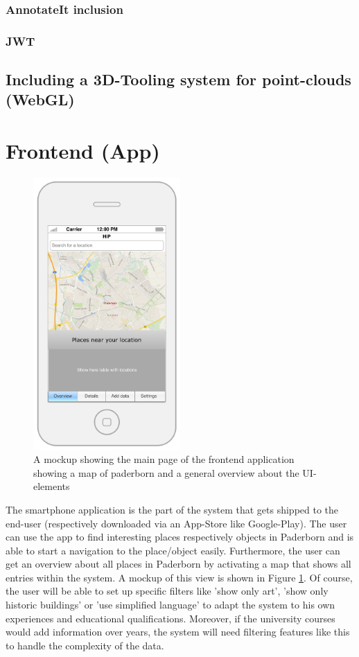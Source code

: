 \subsubsection{AnnotateIt inclusion}

\subsubsection{JWT}

\subsection{Including a 3D-Tooling system for point-clouds (WebGL)}

\section{Frontend (App)}
\begin{figure}[th]
\centerline{\includegraphics[width=0.5\textwidth]{gfx/mockup_app_1}}
\caption{A mockup showing the main page of the frontend application showing a map of paderborn and a general overview about the UI-elements}
\label{app1}
\end{figure}

The smartphone application is the part of the system that gets shipped to the end-user (respectively downloaded via an App-Store like Google-Play). The user can use the app to find interesting places respectively objects in Paderborn and is able to start a navigation to the place/object easily. Furthermore, the user can get an overview about all places in Paderborn by activating a map that shows all entries within the system. A mockup of this view is shown in Figure \ref{app1}. Of course, the user will be able to set up specific filters like 'show only art', 'show only historic buildings' or 'use simplified language' to adapt the system to his own experiences and educational qualifications. Moreover, if the university courses would add information over years, the system will need filtering features like this to handle the complexity of the data.

